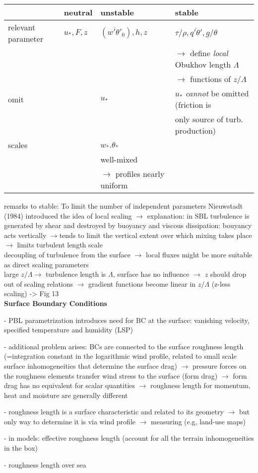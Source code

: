 \documentclass[11pt]{article}
\begin{document}
	\begin{tabular}{llll}
	&	\textbf{neutral} & \textbf{unstable} & \textbf{stable} \\
	\hline 
	relevant parameter &$u_*, F, z$ & $(\overline{w'\theta'}_0), h,z$ & $\tau/\rho, \overline{q'\theta'}, g/\theta$\\	
	&&&$\rightarrow$ define \textit{local} Obukhov length $\Lambda$ \\
	&&&$\rightarrow$ functions of $z/\Lambda$ \\
	omit &&$u_*$& $u_*$ \textit{cannot} be omitted (friction is\\
	&&& only source of turb. production) \\
	scales &&$w_*. \theta_*$& \\
	&&well-mixed \\
	&&$\rightarrow$ profiles nearly uniform
\end{tabular}
	
	remarks to stable: To limit the number of independent parameters Nieuwstadt (1984) introduced the idea of local scaling $\rightarrow$ explanation: in SBL turbulence is generated by shear and destroyed by buoyancy and viscous dissipation: bouyancy acts vertically $\rightarrow$tends to limit the vertical extent over which mixing takes place $\rightarrow$ limits turbulent length scale\\
	decoupling of turbulence from the surface $\rightarrow$ local fluxes might be more suitable as direct scaling parameters \\
	
	large $z/\Lambda \rightarrow$ turbulence length is $\Lambda$, surface has no influence $\rightarrow$ $z$ should drop out of scaling relations $\rightarrow$ gradient functions become linear in $z/\Lambda$ (z-less scaling) -> Fig 13\\
	
	\textbf{Surface Boundary Conditions}
	\begin{compactenum}
		\item[-] PBL parametrization introduces need for BC at the surface: vanishing velocity, specified temperature and humidity (LSP)
		\item[-] additional problem arises: BCs are connected to the surface roughness length (=integration constant in the logarithmic wind profile, related to small scale surface inhomogeneities that determine the surface drag) $\rightarrow$ pressure forces on the roughness elements transfer wind stress to the surface (form drag) $\rightarrow$ form drag has no equivalent for scalar quantities $\rightarrow$ roughness length for momentum, heat and moisture are generally different
		\item[-] roughness length is a surface characteristic and related to its geometry $\rightarrow$ but only way to determine it is via wind profile $\rightarrow$ measuring (e.g, land-use maps)
		\item[-] in models: effective roughness length (account for all the terrain inhomogeneities in the box)
		\item[-] roughness length over sea
	\end{compactenum}
	
\end{document}
